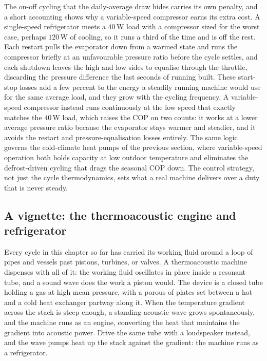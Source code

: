 

\begin{mastery}
The on-off cycling that the daily-average draw hides carries its own penalty,
and a short accounting shows why a variable-speed compressor earns its extra
cost. A single-speed refrigerator meets a $40\,\text{W}$ load with a
compressor sized for the worst case, perhaps $120\,\text{W}$ of cooling, so it
runs a third of the time and is off the rest. Each restart pulls the
evaporator down from a warmed state and runs the compressor briefly at an
unfavourable pressure ratio before the cycle settles, and each shutdown leaves
the high and low sides to equalise through the throttle, discarding the
pressure difference the last seconds of running built. These start-stop losses
add a few percent to the energy a steadily running machine would use for the
same average load, and they grow with the cycling frequency. A variable-speed
compressor instead runs continuously at the low speed that exactly matches the
$40\,\text{W}$ load, which raises the COP on two counts: it works at a lower
average pressure ratio because the evaporator stays warmer and steadier, and
it avoids the restart and pressure-equalisation losses entirely. The same
logic governs the cold-climate heat pumps of the previous section, where
variable-speed operation both holds capacity at low outdoor temperature and
eliminates the defrost-driven cycling that drags the seasonal COP down. The
control strategy, not just the cycle thermodynamics, sets what a real machine
delivers over a duty that is never steady.
\end{mastery}

\subsection{A vignette: the thermoacoustic engine and refrigerator}

Every cycle in this chapter so far has carried its working fluid around a loop of
pipes and vessels past pistons, turbines, or valves. A thermoacoustic machine
dispenses with all of it: the working fluid oscillates in place inside a resonant
tube, and a sound wave does the work a piston would. The device is a closed tube
holding a gas at high mean pressure, with a porous  of plates set
between a hot and a cold heat exchanger partway along it. When the temperature
gradient across the stack is steep enough, a standing acoustic wave grows
spontaneously, and the machine runs as an engine, converting the heat that
maintains the gradient into acoustic power. Drive the same tube with a
loudspeaker instead, and the wave pumps heat up the stack against the gradient:
the machine runs as a refrigerator.

